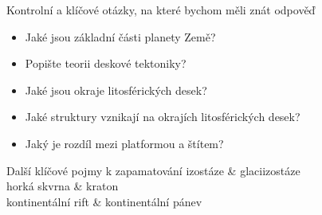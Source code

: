\newpage
\onecolumn
\begin{boxotazky}{Kontrolní a klíčové otázky, na které bychom měli znát odpověď}
	\begin{itemize}
		\item Jaké jsou základní části planety Země?
		\item Popište teorii deskové tektoniky?
		\item Jaké jsou okraje litosférických desek?
		\item Jaké struktury vznikají na okrajích litosférických desek?
		\item Jaký je rozdíl mezi platformou a štítem?
	\end{itemize}
\end{boxotazky}

\begin{boxslovnik}{Další klíčové pojmy k zapamatování}
	izostáze & glaciizostáze \\
	horká skvrna & kraton \\
	kontinentální rift & kontinentální pánev \\
\end{boxslovnik}
\twocolumn